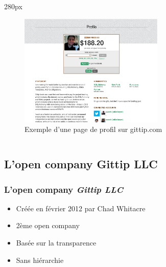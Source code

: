 {
\logo{}
\begin{frame}
\begin{center}
\begin{columns}
\begin{column}{280px}
{
    \begin{figure}[h!]
        \centering
        \includegraphics[width=260px]{images/section1/profilepage-gittip.eps}
        \caption{Exemple d'une page de profil sur gittip.com}
    \end{figure}
}
\end{column}
\end{columns}
\end{center}
\end{frame}
}


    \subsection{L'open company Gittip LLC}


\begin{frame}
\frametitle{L'open company \emph{Gittip LLC}}

\begin{itemize}
    \itemsep1.5em
    \item Créée en février 2012 par Chad Whitacre
    \item 2ème open company
    \item Basée sur la transparence
    \item Sans hiérarchie
\end{itemize}
\end{frame}
